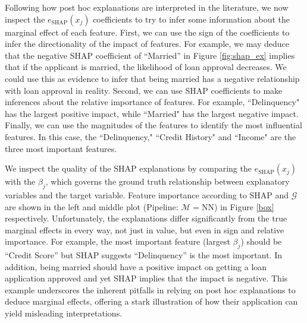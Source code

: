 \documentclass[mnsc,blindrev]{informs3}
\newcommand{\mM}{\mathcal{M}}
\begin{document}
 Following how post hoc explanations are interpreted in the literature, we now inspect the $e_\text{SHAP}(x_j)$ coefficients to try to infer some information about the marginal effect of each feature. First, we can use the sign of the coefficients to infer the directionality of the impact of features. For example, we may deduce that the negative SHAP coefficient of ``Married'' in Figure \ref{fig:shap_ex} implies that if the applicant is married, the likelihood of loan approval decreases. We could use this as evidence to infer that being married has a negative relationship with loan approval in reality. Second, we can use SHAP coefficients to make inferences about the relative importance of features. For example,  ``Delinquency" has the largest positive impact, while ``Married" has the largest negative impact. Finally, we can use the magnitudes of the features to identify the most influential features. In this case, the ``Delinquency," ``Credit History" and ``Income" are the three most important features. 

We inspect the quality of the SHAP explanations by comparing the $e_\text{SHAP}(x_j)$ with the $\beta_j$, which governs the ground truth relationship between explanatory variables and the target variable. Feature importance according to SHAP and $\mathcal{G}$ are  shown in the left and middle plot (Pipeline: $\mM=$NN) in Figure \ref{box} respectively. Unfortunately, the explanations differ significantly from the true marginal effects in every way, not just in value, but even in sign and relative importance. For example, the most important feature (largest $\beta_j$) should be ``Credit Score'' but SHAP suggests ``Delinquency'' is the most important. In addition, being married should have a positive impact on getting a loan application approved and yet SHAP implies that the impact is negative. This example underscores the inherent pitfalls in relying on post hoc explanations to deduce marginal effects, offering a stark illustration of how their application can yield misleading interpretations. 

\end{document}

